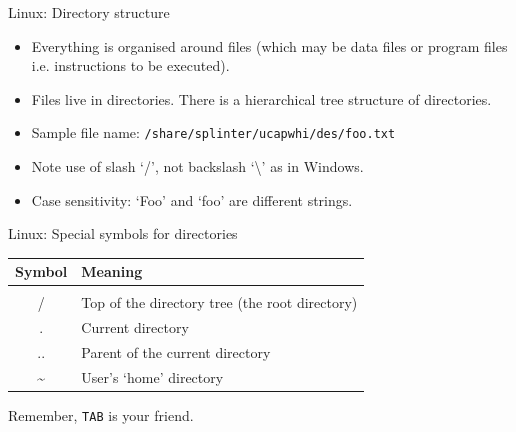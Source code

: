 \documentclass{beamer}
\begin{document}
\begin{frame}{Linux: Directory structure}
  \begin{itemize}
    \item{Everything is organised around files (which may be data files or program files i.e. instructions to be executed).}
    \item{Files live in directories. There is a hierarchical tree structure of directories.}
    \item{Sample file name: \texttt{/share/splinter/ucapwhi/des/foo.txt}}
    \item{Note use of slash `/', not backslash `\textbackslash' as in Windows.}
    \item{Case sensitivity: `Foo' and `foo' are different strings.}
  \end{itemize}
\end{frame}

\begin{frame}{Linux: Special symbols for directories}
  \begin{table}[ht]
    \centering
    \begin{tabular}{c l}
      \\ [-2ex]
      Symbol & Meaning \\ [.5ex]
      \hline \\ [-2ex]
      / & Top of the directory tree (the root directory) \\
      . & Current directory \\
      .. & Parent of the current directory \\
      \textasciitilde & User's `home' directory
    \end{tabular}
  \end{table}

    \begin{block}{}
  
    \end{block}
    \begin{block}{}
       Remember, \texttt{TAB} is your friend.
    \end{block}



\end{frame}
\end{document}
